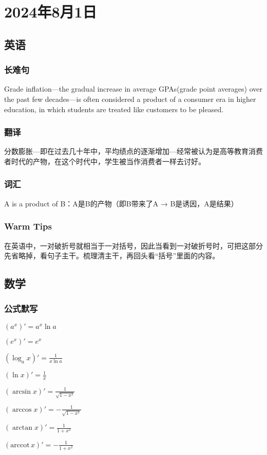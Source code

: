 \documentclass[UTF8]{ctexart}
\newcommand{\arccot}{\mathrm{arccot}\,}
\begin{document}
\section{2024年8月1日}
\subsection{英语}
\subsubsection{长难句}
Grade inflation---the gradual increase in average GPAs(grade point averages) over the past few decades---is often considered a product of a consumer era in higher education, in which students are treated like customers to be pleased.
\subsubsection{翻译}
分数膨胀---即在过去几十年中，平均绩点的逐渐增加---经常被认为是高等教育消费者时代的产物，在这个时代中，学生被当作消费者一样去讨好。
\subsubsection{词汇}
A is a product of B：A是B的产物（即B带来了A → B是诱因，A是结果）
\subsubsection{Warm Tips}
在英语中，一对破折号就相当于一对括号，因此当看到一对破折号时，可把这部分先省略掉，看句子主干。梳理清主干，再回头看“括号”里面的内容。
\subsection{数学}
\subsubsection{公式默写}
\begin{multicols}{3}
      $(a^x)'=a^x\ln a$

      $(e^x)'=e^x$

      $(\log_a x)'=\frac{1}{x\ln a}$

      $(\ln x)'=\frac{1}{x}$

      $(\arcsin x)'=\frac{1}{\sqrt{1-x^2}}$

      $(\arccos x)'=-\frac{1}{\sqrt{1-x^2}}$

      $(\arctan x)'=\frac{1}{1+x^2}$

      $(\arccot x)'=-\frac{1}{1+x^2}$
\end{multicols}
\end{document}
